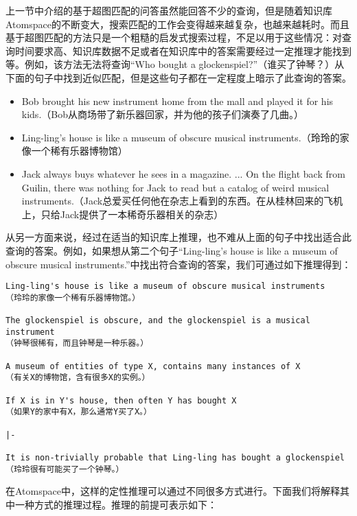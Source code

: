上一节中介绍的基于超图匹配的问答虽然能回答不少的查询，但是随着知识库Atomspace的不断变大，搜索匹配的工作会变得越来越复杂，也越来越耗时。而且基于超图匹配的方法只是一个粗糙的启发式搜索过程，不足以用于这些情况：对查询时间要求高、知识库数据不足或者在知识库中的答案需要经过一定推理才能找到等。例如，该方法无法将查询“Who bought a glockenspiel?”（谁买了钟琴？）从下面的句子中找到近似匹配，但是这些句子都在一定程度上暗示了此查询的答案。

\begin{itemize}
\item Bob brought his new instrument home from the mall and played it for his kids.（Bob从商场带了新乐器回家，并为他的孩子们演奏了几曲。）
\item Ling-ling's house is like a museum of obscure musical instruments.（玲玲的家像一个稀有乐器博物馆）
\item Jack always buys whatever he sees in a magazine. ... On the flight back from Guilin, there was nothing for Jack to read but a catalog of weird musical instruments.（Jack总爱买任何他在杂志上看到的东西。在从桂林回来的飞机上，只给Jack提供了一本稀奇乐器相关的杂志）
\end{itemize}

从另一方面来说，经过在适当的知识库上推理，也不难从上面的句子中找出适合此查询的答案。例如，如果想从第二个句子“Ling-ling's house is like a museum of obscure musical instruments.”中找出符合查询的答案，我们可通过如下推理得到：

\begin{verbatim}
Ling-ling's house is like a museum of obscure musical instruments
（玲玲的家像一个稀有乐器博物馆。）

The glockenspiel is obscure, and the glockenspiel is a musical instrument
（钟琴很稀有，而且钟琴是一种乐器。）

A museum of entities of type X, contains many instances of X
（有关X的博物馆，含有很多X的实例。）

If X is in Y's house, then often Y has bought X
（如果Y的家中有X，那么通常Y买了X。）

|-

It is non-trivially probable that Ling-ling has bought a glockenspiel
（玲玲很有可能买了一个钟琴。）
\end{verbatim}

在Atomspace中，这样的定性推理可以通过不同很多方式进行。下面我们将解释其中一种方式的推理过程。推理的前提可表示如下：

